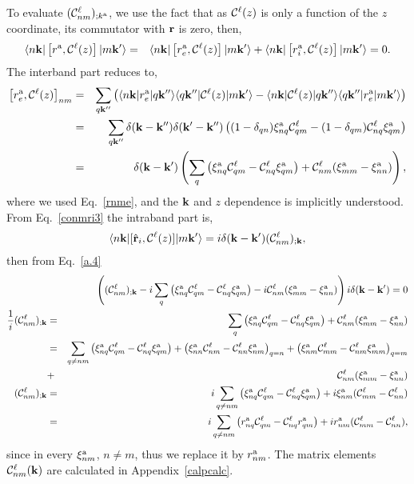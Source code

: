 To evaluate $({\mathbf{\cal C}}^\ell_{nm})_{;k^{\mathrm{a}}}$, we use the fact that as
${\mathbf{\cal C}}^\ell(z)$ is only a function of the $z$ coordinate, its commutator
with $\mathbf{r}$ is zero, then,
\begin{eqnarray}\label{a.4}
\langle n\mathbf{k} |
\left[r^{\mathrm{a}},{\mathbf{\cal C}}^\ell(z)\right]
| m\mathbf{k}' \rangle
&=&
\langle n\mathbf{k} |
\left[r_e^{\mathrm{a}},{\mathbf{\cal C}}^\ell(z)\right]
| m\mathbf{k}' \rangle
+
\langle n\mathbf{k} |
\left[r_i^{\mathrm{a}},{\mathbf{\cal C}}^\ell(z)\right]
| m\mathbf{k}' \rangle
=
 0
.
\end{eqnarray} 
The interband part reduces to,
\begin{eqnarray}\label{a.5}
\left[r_e^{\mathrm{a}},{\mathbf{\cal C}}^\ell(z)\right]_{nm}
&=&
\sum_{q\mathbf{k}''}
\left(
\langle n\mathbf{k} |
r_e^{\mathrm{a}}
| q\mathbf{k}'' \rangle
\langle q\mathbf{k}'' |
{\mathbf{\cal C}}^\ell(z)
| m\mathbf{k}' \rangle
-
\langle n\mathbf{k} |
{\mathbf{\cal C}}^\ell(z)
 | q\mathbf{k}'' \rangle
\langle q\mathbf{k}'' |
r_e^{\mathrm{a}}
| m\mathbf{k}' \rangle
\right)
\nonumber\\
&=&
\sum_{q\mathbf{k}''}
\delta(\mathbf{k}-\mathbf{k}'')
\delta(\mathbf{k}'-\mathbf{k}'')
\left(
(1-\delta_{qn})
\xi_{nq}^{\mathrm{a}}
{\mathbf{\cal C}}^\ell_{qm}
-
(1-\delta_{qm})
{\mathbf{\cal C}}^\ell_{nq}
\xi_{qm}^{\mathrm{a}}
\right)
\nonumber\\
&=&
\delta(\mathbf{k}-\mathbf{k}')
\left(
\sum_{q}
\left(
\xi_{nq}^{\mathrm{a}}
{\mathbf{\cal C}}^\ell_{qm}
-
{\mathbf{\cal C}}^\ell_{nq}
\xi_{qm}^{\mathrm{a}}
\right)
+
{\mathbf{\cal C}}^\ell_{nm}(\xi_{mm}^{\mathrm{a}}-\xi_{nn}^{\mathrm{a}})
\right)
,
\end{eqnarray}
where we used Eq.~\eqref{rnme}, and the $\mathbf{k}$ and $z$ dependence is implicitly
understood. From Eq.~\eqref{conmri3} the intraband part is,
\begin{eqnarray}\label{a.6}
\langle n\mathbf{k} |[\hat{\mathbf{r}}_i,{\mathbf{\cal C}}^\ell(z)]| m\mathbf{k}' \rangle
=i\delta(\mathbf{k}-\mathbf{k}')({\mathbf{\cal C}}^\ell_{nm})_{;\mathbf{k}}
,
\end{eqnarray}
then from Eq.~\eqref{a.4}
\begin{eqnarray}\label{a.7}
&&
\left(
({\mathbf{\cal C}}^\ell_{nm})_{;\mathbf{k}}
-i
\sum_{q}
\left(
\xi_{nq}^{\mathrm{a}}
{\mathbf{\cal C}}^\ell_{qm}
-
{\mathbf{\cal C}}^\ell_{nq}
\xi_{qm}^{\mathrm{a}}
\right)
-i
{\mathbf{\cal C}}^\ell_{nm}(\xi_{mm}^{\mathrm{a}}-\xi_{nn}^{\mathrm{a}})
\right) i\delta(\mathbf{k}-\mathbf{k}')
=0
\nonumber\\
\frac{1}{i}({\mathbf{\cal C}}^\ell_{nm})_{;\mathbf{k}}
&=&
\sum_{q}
\left(
\xi_{nq}^{\mathrm{a}}
{\mathbf{\cal C}}^\ell_{qm}
-
{\mathbf{\cal C}}^\ell_{nq}
\xi_{qm}^{\mathrm{a}}
\right)
+
{\mathbf{\cal C}}^\ell_{nm}(\xi_{mm}^{\mathrm{a}}-\xi_{nn}^{\mathrm{a}})
\nonumber\\
&=&
\sum_{q\ne nm}
\left(
\xi_{nq}^{\mathrm{a}}
{\mathbf{\cal C}}^\ell_{qm}
-
{\mathbf{\cal C}}^\ell_{nq}
\xi_{qm}^{\mathrm{a}}
\right)
+
\left(
\xi_{nn}^{\mathrm{a}}
{\mathbf{\cal C}}^\ell_{nm}
-
{\mathbf{\cal C}}^\ell_{nn}
\xi_{nm}^{\mathrm{a}}
\right)_{q=n}
+
\left(
\xi_{nm}^{\mathrm{a}}
{\mathbf{\cal C}}^\ell_{mm}
-
{\mathbf{\cal C}}^\ell_{nm}
\xi_{mm}^{\mathrm{a}}
\right)_{q=m}
\nonumber\\
&+&
{\mathbf{\cal C}}^\ell_{nm}(\xi_{mm}^{\mathrm{a}}-\xi_{nn}^{\mathrm{a}})
\nonumber\\
({\mathbf{\cal C}}^\ell_{nm})_{;\mathbf{k}}
&=&
i\sum_{q\ne nm}
\left(
\xi_{nq}^{\mathrm{a}}
{\mathbf{\cal C}}^\ell_{qm}
-
{\mathbf{\cal C}}^\ell_{nq}
\xi_{qm}^{\mathrm{a}}
\right)
+i\xi_{nm}^{\mathrm{a}}({\mathbf{\cal C}}^\ell_{mm}-{\mathbf{\cal C}}^\ell_{nn})
\nonumber\\
&=&
i\sum_{q\ne nm}
\left(
r_{nq}^{\mathrm{a}}
{\mathbf{\cal C}}^\ell_{qm}
-
{\mathbf{\cal C}}^\ell_{nq}
r_{qm}^{\mathrm{a}}
\right)
+ir_{nm}^{\mathrm{a}}({\mathbf{\cal C}}^\ell_{mm}-{\mathbf{\cal C}}^\ell_{nn})
,
\end{eqnarray} 
since in every $\xi_{nm}^{\mathrm{a}}$, $n\ne m$, thus we replace it by $r^{\mathrm{a}}_{nm}$. 
The matrix elements ${\mathbf{\cal C}}^\ell_{nm}(\mathbf{k})$ are calculated in Appendix~\ref{calpcalc}. 

